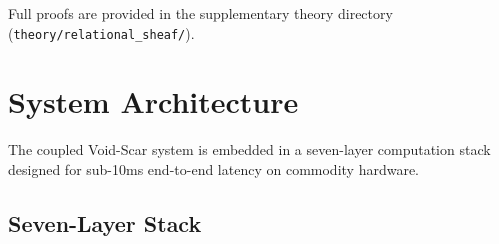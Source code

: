 \documentclass[11pt]{article}
\begin{document}
Full proofs are provided in the supplementary theory directory (\texttt{theory/relational\_sheaf/}).

\section{System Architecture}
\label{sec:architecture}

The coupled Void-Scar system is embedded in a seven-layer computation stack designed for sub-10ms end-to-end latency on commodity hardware.

\subsection{Seven-Layer Stack}
\end{document}
